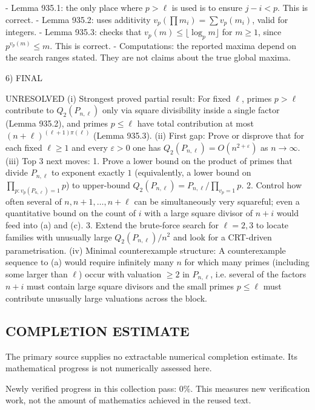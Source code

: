 - Lemma 935.1: the only place where \(p>\ell\) is used is to ensure \(j-i < p\). This is correct.
- Lemma 935.2: uses additivity \(v_p(\prod m_i)=\sum v_p(m_i)\), valid for integers.
- Lemma 935.3: checks that \(v_p(m)\le \lfloor\log_p m\rfloor\) for \(m\ge1\), since \(p^{v_p(m)}\le m\). This is correct.
- Computations: the reported maxima depend on the search ranges stated. They are not claims about the true global maxima.

6) FINAL

UNRESOLVED
(i) Strongest proved partial result: For fixed \(\ell\), primes \(p>\ell\) contribute to \(Q_2(P_{n,\ell})\) only via square divisibility inside a single factor (Lemma 935.2), and primes \(p\le \ell\) have total contribution at most \((n+\ell)^{(\ell+1)\pi(\ell)}\) (Lemma 935.3).
(ii) First gap: Prove or disprove that for each fixed \(\ell\ge1\) and every \(\varepsilon>0\) one has \(Q_2(P_{n,\ell})=O(n^{2+\varepsilon})\) as \(n\to\infty\).
(iii) Top 3 next moves:
  1. Prove a lower bound on the product of primes that divide \(P_{n,\ell}\) to exponent exactly \(1\) (equivalently, a lower bound on \(\prod_{p: v_p(P_{n,\ell})=1} p\)) to upper-bound \(Q_2(P_{n,\ell})=P_{n,\ell}/\prod_{v_p=1}p\).
  2. Control how often several of \(n,n+1,\dots,n+\ell\) can be simultaneously very squareful; even a quantitative bound on the count of \(i\) with a large square divisor of \(n+i\) would feed into (a) and (c).
  3. Extend the brute-force search for \(\ell=2,3\) to locate families with unusually large \(Q_2(P_{n,\ell})/n^2\) and look for a CRT-driven parametrisation.
(iv) Minimal counterexample structure: A counterexample sequence to (a) would require infinitely many \(n\) for which many primes (including some larger than \(\ell\)) occur with valuation \(\ge2\) in \(P_{n,\ell}\), i.e. several of the factors \(n+i\) must contain large square divisors and the small primes \(p\le \ell\) must contribute unusually large valuations across the block.




\subsection*{COMPLETION ESTIMATE}
The primary source supplies no extractable numerical completion estimate. Its mathematical progress is not numerically assessed here.

Newly verified progress in this collection pass: $0\%$. This measures new verification work, not the amount of mathematics achieved in the reused text.
